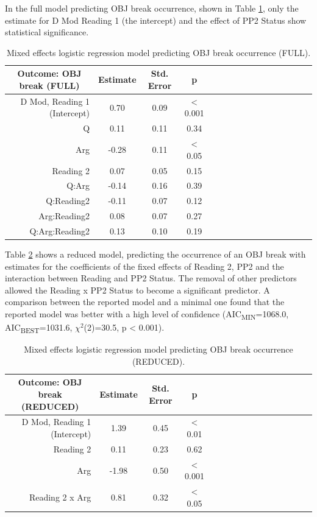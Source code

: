 \documentclass[12pt,oneside]{book}
\begin{document}
In the full model predicting OBJ break occurrence, shown in Table \ref{tab:fullobjmod}, only the estimate for D Mod Reading 1 (the intercept) and the effect of PP2 Status show statistical significance.

\begin{table}[!h]

\caption{\label{tab:fullobjmod}Mixed effects logistic regression model predicting OBJ break occurrence (FULL).}
\centering
\begin{tabular}{rcccrcccrcccrccc}
\toprule
\multicolumn{1}{c}{Outcome: OBJ break (FULL)} & \multicolumn{1}{c}{Estimate} & \multicolumn{1}{c}{Std. Error} & \multicolumn{1}{c}{p}\\
\midrule
D Mod, Reading 1 (Intercept) & 0.70 & 0.09 & < 0.001\\
Q & 0.11 & 0.11 & 0.34\\
Arg & -0.28 & 0.11 & < 0.05\\
Reading 2 & 0.07 & 0.05 & 0.15\\
Q:Arg & -0.14 & 0.16 & 0.39\\
\addlinespace
Q:Reading2 & -0.11 & 0.07 & 0.12\\
Arg:Reading2 & 0.08 & 0.07 & 0.27\\
Q:Arg:Reading2 & 0.13 & 0.10 & 0.19\\
\bottomrule
\end{tabular}
\end{table}

Table \ref{tab:objMod} shows a reduced model, predicting the occurrence of an OBJ break with estimates for the coefficients of the fixed effects of Reading 2, PP2 and the interaction between Reading and PP2 Status. The removal of other predictors allowed the Reading x PP2 Status to become a significant predictor. A comparison between the reported model and a minimal one found that the reported model was better with a high level of confidence (AIC\textsubscript{MIN}=1068.0, AIC\textsubscript{BEST}=1031.6, \(\chi^2\)(2)=30.5, p \textless{} 0.001).

\begin{table}[!h]

\caption{\label{tab:objMod}Mixed effects logistic regression model predicting OBJ break occurrence (REDUCED).}
\centering
\begin{tabular}{rcccrcccrcccrccc}
\toprule
\multicolumn{1}{c}{Outcome: OBJ break (REDUCED)} & \multicolumn{1}{c}{Estimate} & \multicolumn{1}{c}{Std. Error} & \multicolumn{1}{c}{p}\\
\midrule
D Mod, Reading 1 (Intercept) & 1.39 & 0.45 & < 0.01\\
Reading 2 & 0.11 & 0.23 & 0.62\\
Arg & -1.98 & 0.50 & < 0.001\\
Reading 2 x Arg & 0.81 & 0.32 & < 0.05\\
\bottomrule
\end{tabular}
\end{table}
\end{document}
